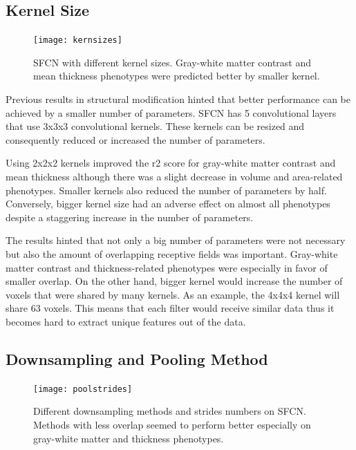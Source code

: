 \documentclass{article}
\begin{document}
    \subsection*{Kernel Size}
    
    \begin{figure}[h]
        \centering
        \texttt{[image: kernsizes]}
        \centering
        \caption{
            SFCN with different kernel sizes. 
            Gray-white matter contrast and mean thickness phenotypes were predicted better by smaller kernel.}
        \label{fig:kernsizes}
    \end{figure}

    Previous results in structural modification hinted that better performance can be achieved by a smaller number of parameters. 
    SFCN has 5 convolutional layers that use 3x3x3 convolutional kernels. 
    These kernels can be resized and consequently reduced or increased the number of parameters. 

    Using 2x2x2 kernels improved the r2 score for gray-white matter contrast and mean thickness although there was a slight decrease in volume and area-related phenotypes. 
    Smaller kernels also reduced the number of parameters by half.  
    Conversely, bigger kernel size had an adverse effect on almost all phenotypes despite a staggering increase in the number of parameters.

    The results hinted that not only a big number of parameters were not necessary but also the amount of overlapping receptive fields was important. 
    Gray-white matter contrast and thickness-related phenotypes were especially in favor of smaller overlap. 
    On the other hand, bigger kernel would increase the number of voxels that were shared by many kernels. 
    As an example, the 4x4x4 kernel will share 63 voxels. 
    This means that each filter would receive similar data thus it becomes hard to extract unique features out of the data.


    \subsection*{Downsampling and Pooling Method}
    
    \begin{figure}[h]
        \centering
        \texttt{[image: poolstrides]}
        \centering
        \caption{
            Different downsampling methods and strides numbers on SFCN. 
            Methods with less overlap seemed to perform better especially on gray-white matter and thickness phenotypes.}
        \label{fig:poolstrides}
    \end{figure}
\end{document}
